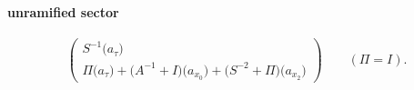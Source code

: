 \paragraph{unramified sector}
\[\begin{pmatrix}S^{-1}\bigl(a_{\tau}\bigr)\\\Pi\bigl(a_{\tau}\bigr)+\bigl(A^{-1}+I\bigr)\bigl(a_{x_{0}}\bigr)+\bigl(S^{-2}+\Pi\bigr)\bigl(a_{x_{2}}\bigr)\end{pmatrix}\qquad(\Pi=I).\]
